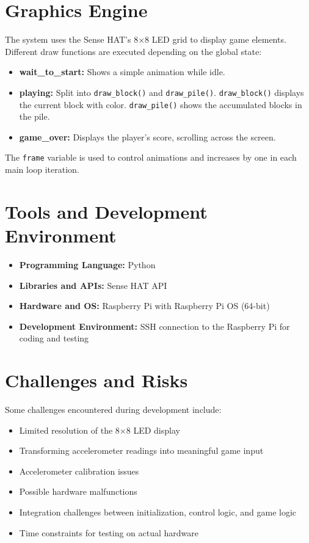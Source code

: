 \documentclass[11pt,titlepage,openright]{book}
\begin{document}
\section{Graphics Engine}
The system uses the Sense HAT’s 8$\times$8 LED grid to display game elements. Different draw functions are executed depending on the global state:

\begin{itemize}
    \item \textbf{wait\_to\_start:} Shows a simple animation while idle.
    \item \textbf{playing:} Split into \texttt{draw\_block()} and \texttt{draw\_pile()}. \texttt{draw\_block()} displays the current block with color. \texttt{draw\_pile()} shows the accumulated blocks in the pile.
    \item \textbf{game\_over:} Displays the player’s score, scrolling across the screen.
\end{itemize}

The \texttt{frame} variable is used to control animations and increases by one in each main loop iteration.

\section{Tools and Development Environment}
\begin{itemize}
    \item \textbf{Programming Language:} Python
    \item \textbf{Libraries and APIs:} Sense HAT API
    \item \textbf{Hardware and OS:} Raspberry Pi with Raspberry Pi OS (64-bit)
    \item \textbf{Development Environment:} SSH connection to the Raspberry Pi for coding and testing
\end{itemize}

\section{Challenges and Risks}
Some challenges encountered during development include:

\begin{itemize}
    \item Limited resolution of the 8$\times$8 LED display
    \item Transforming accelerometer readings into meaningful game input
    \item Accelerometer calibration issues
    \item Possible hardware malfunctions
    \item Integration challenges between initialization, control logic, and game logic
    \item Time constraints for testing on actual hardware
\end{itemize}
\end{document}

